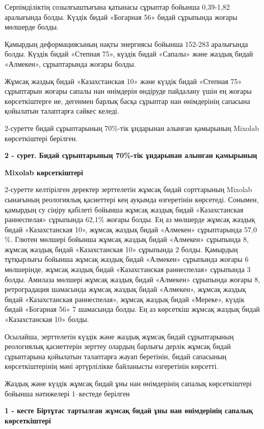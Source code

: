 {{Серпімділіктің созылғыштығына қатынасы сұрыптар бойынша 0,39-1,82
аралығында болды. Күздік бидай «Богарная 56» бидай сұрыпында жоғары
мөлшерде болды.

Қамырдың деформациясының нақты энергиясы бойынша 152-283 аралығында
болды. Күздік бидай «Степная 75», күздік бидай «Сапалы» және жаздық
бидай «Алмекен», сұрыптарында жоғары болды.

Жұмсақ жаздық бидай «Казахстанская 10» және күздік бидай «Степная 75»
сұрыптарын жоғары сапалы нан өнімдерін өндіруде пайдалану үшін ең жоғары
көрсеткіштерге ие, дегенмен барлық басқа сұрыптар нан өнімдерінің
сапасына қойылатын талаптарға сәйкес келеді.

2-суретте бидай сұрыптарының 70\%-тік ұндарынан алынған қамырының
Mixolab көрсеткіштері берілген.

{\bfseries 2 - сурет. Бидай сұрыптарының 70\%-тік ұндарынан алынған
қамырының}

{\bfseries Mixolab көрсеткіштері}

2-суретте келтірілген деректер зерттелетін жұмсақ бидай сорттарының
Mixolab сынағының реологиялық қасиеттері кең ауқымда өзгеретінін
көрсетеді. Сонымен, қамырдың су сіңіру қабілеті бойынша жұмсақ жаздық
бидай «Казахстанская раннеспелая» сұрыпында 62,1\% жоғары болды. Ең аз
мөлшерде жұмсақ жаздық бидай «Казахстанская 10», жұмсақ жаздық бидай
«Алмекен» сұрыптарында 57,0 \%. Глютен мөлшері бойынша жұмсақ жаздық
бидай «Алмекен» сұрыпында 8, жұмсақ жаздық бидай «Казахстанская 10»
сұрыпында 2 болды. Қамырдың тұтқырлығы бойынша жұмсақ жаздық бидай
«Алмекен» сұрыпында жоғары 6 мөлшерінде, жұмсақ жаздық бидай
«Казахстанская раннеспелая» сұрыпында 3 болды. Амилаза мөлшері жұмсақ
жаздық бидай «Алмекен» сұрыпында жоғары 8, ретроградация шамасында
жұмсақ жаздық бидай «Алмекен», жұмсақ жаздық бидай «Казахстанская
раннеспелая», жұмсақ жаздық бидай «Мереке», күздік бидай «Богарная 56» 7
шамасында болды. Ең аз көрсеткіш жұмсақ жаздық бидай «Казахстанская 10»
болды.

Осылайша, зерттелетін күздік және жаздық жұмсақ бидай сұрыптарының
реологиялық қасиеттерін зерттеу олардың барлығы дерлік жұмсақ бидай
сұрыптарына қойылатын талаптарға жауап беретінін, бидай сапасының
көрсеткіштерінің мәні әртүрлілікке байланысты өзгеретінін көрсетті.

Жаздық және күздік жұмсақ бидай ұны нан өнімдерінің сапалық
көрсеткіштері бойынша нәтижелері 1--кестеде берілген

{\bfseries 1 - кесте Біртұтас тартылған жұмсақ бидай ұны нан өнімдерінің
сапалық көрсеткіштері}

}}
